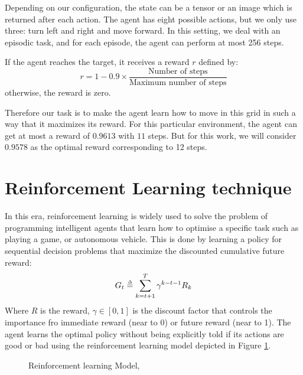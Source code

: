 Depending on our configuration, the state can be a tensor or an image which is returned after each action. The agent has eight possible actions, but we only use three: turn left and right and move forward. In this setting, we deal with an episodic task, and for each episode, the agent can perform at most 256 steps.

If the agent reaches the target, it receives a reward $r$ defined by:
\begin{equation}
	r = 1 - 0.9\times \frac{\text{Number of steps}}{\text{Maximum number of steps}}
\end{equation}
otherwise, the reward is zero.


Therefore our task is to make the agent learn how to move in this grid in such a way that it maximizes its reward. For this particular environment, the agent can get at most a reward of $0.9613$ with $11$ steps. But for this work, we will consider $0.9578$ as the optimal reward corresponding to 12 steps.

\section{Reinforcement Learning technique}\label{sec2}
In this era, reinforcement learning is widely used to solve the problem of programming intelligent agents that learn how to optimise a specific task such as playing a game, or autonomous vehicle. This is done by learning a policy for sequential decision problems that maximize the discounted  cumulative future reward:
\begin{equation}
	G_t \overset{\scriptscriptstyle\Delta}{=} \sum_{k=t+1}^{T} \gamma^{k-t-1}R_k
\end{equation}
Where $R$ is the reward, $\gamma\in [0,1]$ is the discount factor that controls the importance fro immediate reward (near to 0) or future reward (near to 1). The agent learns the optimal policy without being explicitly told if its actions are good or bad using the reinforcement learning model depicted in Figure \ref{fig:RL}.


\begin{figure}
	\centering
	\caption{Reinforcement learning Model, \cite{lecture, book}}
	\label{fig:RL}
\end{figure}

